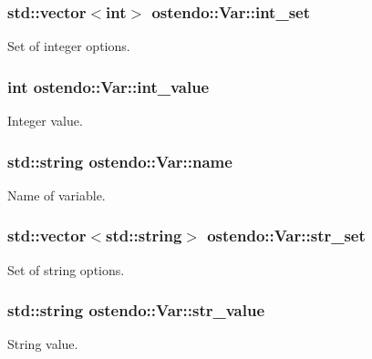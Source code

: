 \subsubsection[{\texorpdfstring{int\+\_\+set}{int_set}}]{\setlength{\rightskip}{0pt plus 5cm}std\+::vector$<$int$>$ ostendo\+::\+Var\+::int\+\_\+set}\hypertarget{structostendo_1_1Var_a169462deb8fb9e599777840a58fffc0d}{}\label{structostendo_1_1Var_a169462deb8fb9e599777840a58fffc0d}
Set of integer options. 
\subsubsection[{\texorpdfstring{int\+\_\+value}{int_value}}]{\setlength{\rightskip}{0pt plus 5cm}int ostendo\+::\+Var\+::int\+\_\+value}\hypertarget{structostendo_1_1Var_ad3e0add5d4dc88469d768bfa0c743379}{}\label{structostendo_1_1Var_ad3e0add5d4dc88469d768bfa0c743379}
Integer value. 
\subsubsection[{\texorpdfstring{name}{name}}]{\setlength{\rightskip}{0pt plus 5cm}std\+::string ostendo\+::\+Var\+::name}\hypertarget{structostendo_1_1Var_a4cf546206d7a22a8008d7b3125a30660}{}\label{structostendo_1_1Var_a4cf546206d7a22a8008d7b3125a30660}
Name of variable. 
\subsubsection[{\texorpdfstring{str\+\_\+set}{str_set}}]{\setlength{\rightskip}{0pt plus 5cm}std\+::vector$<$std\+::string$>$ ostendo\+::\+Var\+::str\+\_\+set}\hypertarget{structostendo_1_1Var_ad900a259793059d2c7ed2ca1767bd6b8}{}\label{structostendo_1_1Var_ad900a259793059d2c7ed2ca1767bd6b8}
Set of string options. 
\subsubsection[{\texorpdfstring{str\+\_\+value}{str_value}}]{\setlength{\rightskip}{0pt plus 5cm}std\+::string ostendo\+::\+Var\+::str\+\_\+value}\hypertarget{structostendo_1_1Var_a8e4299f745a15349c7b665a25475bdca}{}\label{structostendo_1_1Var_a8e4299f745a15349c7b665a25475bdca}
String value. 
